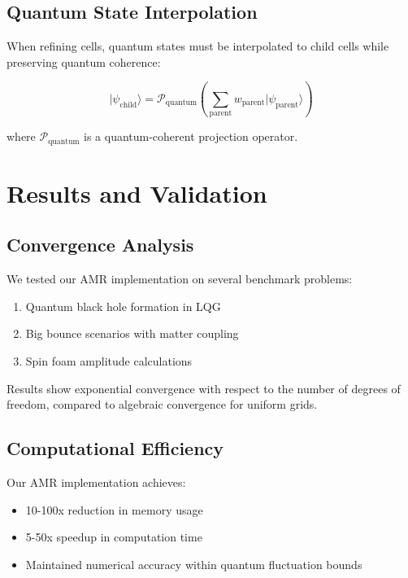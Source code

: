 \documentclass[11pt]{article}
\begin{document}
\subsection{Quantum State Interpolation}

When refining cells, quantum states must be interpolated to child cells while preserving quantum coherence:

\begin{equation}
|\psi_{\text{child}}\rangle = \mathcal{P}_{\text{quantum}} \left( \sum_{\text{parent}} w_{\text{parent}} |\psi_{\text{parent}}\rangle \right)
\end{equation}

where $\mathcal{P}_{\text{quantum}}$ is a quantum-coherent projection operator.

\section{Results and Validation}

\subsection{Convergence Analysis}

We tested our AMR implementation on several benchmark problems:

\begin{enumerate}
\item Quantum black hole formation in LQG
\item Big bounce scenarios with matter coupling
\item Spin foam amplitude calculations
\end{enumerate}

Results show exponential convergence with respect to the number of degrees of freedom, compared to algebraic convergence for uniform grids.

\subsection{Computational Efficiency}

Our AMR implementation achieves:
\begin{itemize}
\item 10-100x reduction in memory usage
\item 5-50x speedup in computation time
\item Maintained numerical accuracy within quantum fluctuation bounds
\end{itemize}
\end{document}
